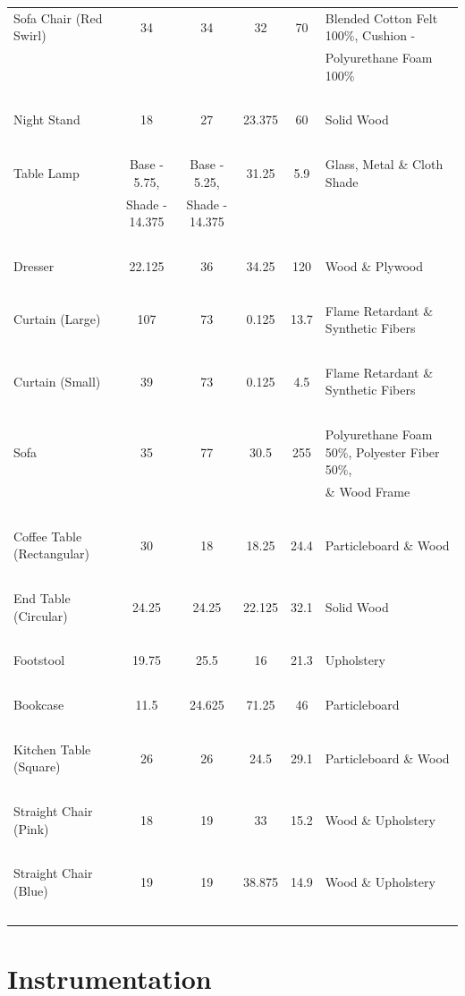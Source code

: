 \documentclass[12pt,oneside]{book}
\begin{document}
\begin{table}
{\begin{tabular}{lccccl}
Sofa Chair (Red Swirl) & 34 & 34 & 32 & 70 & Blended Cotton Felt 100\%, Cushion -\\ &&&&& Polyurethane Foam 100\% 
\\~\\ 
Night Stand & 18 & 27 & 23.375 & 60 & Solid Wood 
\\~\\ 
Table Lamp & Base - 5.75, & Base - 5.25,  & 31.25 & 5.9 & Glass, Metal \& Cloth Shade \\& Shade - 14.375 & Shade - 14.375&&&
\\~\\ 
Dresser & 22.125 & 36 & 34.25 & 120 & Wood \& Plywood 
\\~\\ 
Curtain (Large) & 107 & 73 & 0.125 & 13.7 & Flame Retardant \& Synthetic Fibers 
\\~\\ 
Curtain (Small) & 39 & 73 & 0.125 & 4.5 & Flame Retardant \& Synthetic Fibers 
\\~\\ 
Sofa & 35 & 77 & 30.5 & 255 & Polyurethane Foam 50\%, Polyester Fiber 50\%,\\&&&&& \& Wood Frame 
\\~\\ 
Coffee Table (Rectangular) & 30 & 18 & 18.25 & 24.4 & Particleboard \& Wood 
\\~\\ 
End Table (Circular) & 24.25 & 24.25 & 22.125 & 32.1 & Solid Wood 
\\~\\ 
Footstool & 19.75 & 25.5 & 16 & 21.3 & Upholstery 
\\~\\ 
Bookcase & 11.5 & 24.625 & 71.25 & 46 & Particleboard 
\\~\\ 
Kitchen Table (Square) & 26 & 26 & 24.5 & 29.1 & Particleboard \& Wood 
\\~\\
Straight Chair (Pink) & 18 & 19 & 33 & 15.2 & Wood \& Upholstery 
\\~\\ 
Straight Chair (Blue) & 19 & 19 & 38.875 & 14.9 & Wood \& Upholstery 
\\~\\ 
\bottomrule
\end{tabular}}
\label{table:fuel_weights}
\end{table}

\section{Instrumentation}
\end{document}
